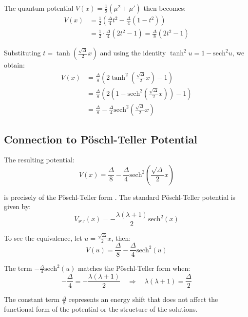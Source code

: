 \documentclass[a4paper,11pt]{article}
\begin{document}
The quantum potential $V(x) = \frac{1}{2}(\mu^2 + \mu')$ then becomes:
\begin{align}
V(x) &= \frac{1}{2}\left(\frac{\Delta}{4}t^2 - \frac{\Delta}{4}(1 - t^2)\right) \\
&= \frac{1}{2}\cdot\frac{\Delta}{4}(2t^2 - 1) = \frac{\Delta}{8}(2t^2 - 1)
\end{align}

Substituting $t = \tanh\left(\frac{\sqrt{\Delta}}{2}x\right)$ and using the identity $\tanh^2 u = 1 - \text{sech}^2 u$, we obtain:
\begin{align}
V(x) &= \frac{\Delta}{8}\left(2\tanh^2\left(\frac{\sqrt{\Delta}}{2}x\right) - 1\right) \\
&= \frac{\Delta}{8}\left(2(1 - \text{sech}^2\left(\frac{\sqrt{\Delta}}{2}x\right)) - 1\right) \\
&= \frac{\Delta}{8} - \frac{\Delta}{4}\text{sech}^2\left(\frac{\sqrt{\Delta}}{2}x\right)
\end{align}

\subsection{Connection to Pöschl-Teller Potential}

The resulting potential:
\begin{equation}
V(x) = \frac{\Delta}{8} - \frac{\Delta}{4}\text{sech}^2\left(\frac{\sqrt{\Delta}}{2}x\right)
\end{equation}

is precisely of the Pöschl-Teller form \cite{Zuhlsdorff2001}. The standard Pöschl-Teller potential is given by:
\begin{equation}
V_{\text{PT}}(x) = -\frac{\lambda(\lambda + 1)}{2}\text{sech}^2(x)
\end{equation}

To see the equivalence, let $u = \frac{\sqrt{\Delta}}{2}x$, then:
\begin{equation}
V(u) = \frac{\Delta}{8} - \frac{\Delta}{4}\text{sech}^2(u)
\end{equation}

The term $-\frac{\Delta}{4}\text{sech}^2(u)$ matches the Pöschl-Teller form when:
\begin{equation}
-\frac{\Delta}{4} = -\frac{\lambda(\lambda + 1)}{2} \quad \Rightarrow \quad \lambda(\lambda + 1) = \frac{\Delta}{2}
\end{equation}

The constant term $\frac{\Delta}{8}$ represents an energy shift that does not affect the functional form of the potential or the structure of the solutions.
\end{document}
